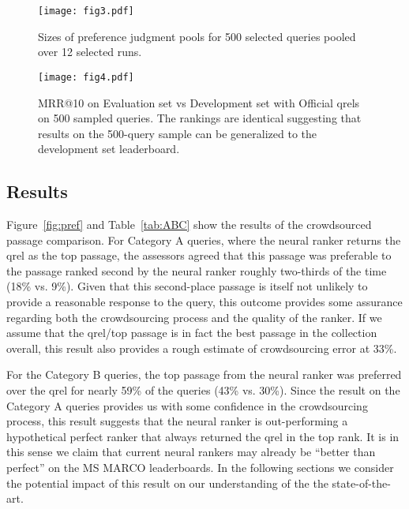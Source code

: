 \documentclass[fullpage]{article}
\begin{document}
\begin{figure}[p]
  \centering
  \vspace*{1cm}
  \texttt{[image: fig3.pdf]}
  \caption{Sizes of preference judgment pools for 500 selected queries pooled over 12 selected runs.}
  \label{fig:smallpools}
\end{figure}

\begin{figure}[t]
    \centering
    \texttt{[image: fig4.pdf]}
    \caption{MRR@10 on Evaluation set vs Development set with Official qrels on 500 sampled queries. The rankings are identical suggesting that results on the 500-query sample can be generalized to the development set leaderboard.}
    \label{fig:evalvsdev}
\end{figure}

\subsection{Results}

Figure~\ref{fig:pref} and Table~\ref{tab:ABC} show the results of the crowdsourced passage comparison. For Category A queries, where the neural ranker returns the qrel as the top passage, the assessors agreed that this passage was preferable to the passage ranked second by the neural ranker roughly two-thirds of the time (18\% vs. 9\%). Given that this second-place passage is itself not unlikely to provide a reasonable response to the query, this outcome provides some assurance regarding both the crowdsourcing process and the quality of the ranker. If we assume that the qrel/top passage is in fact the best passage in the collection overall, this result also provides a rough estimate of crowdsourcing error at 33\%.

For the Category B queries, the top passage from the neural ranker was preferred over the qrel for nearly 59\% of the queries (43\% vs. 30\%). Since the result on the Category A queries provides us with some confidence in the crowdsourcing process, this result suggests that the neural ranker is out-performing a hypothetical perfect ranker that always returned the qrel in the top rank. It is in this sense we claim that current neural rankers may already be ``better than perfect'' on the MS MARCO leaderboards. In the following sections we consider the potential impact of this result on our understanding of the the state-of-the-art.
\end{document}
